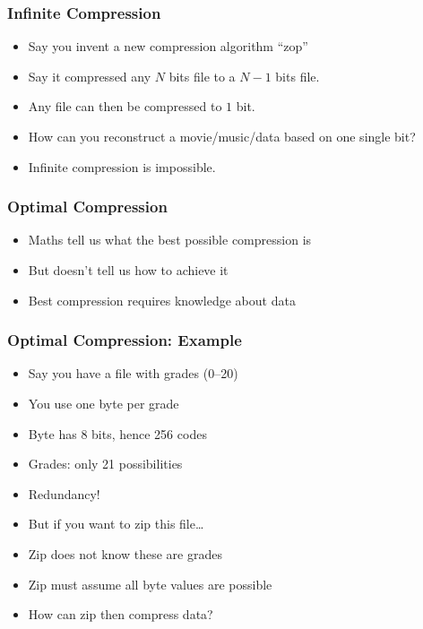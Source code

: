 \begin{frame}
  \frametitle{Infinite Compression}
  \begin{itemize}
    \item Say you invent a new compression algorithm ``zop''
    \item Say it compressed any $N$ bits file to a $N-1$ bits file.
    \item Any file can then be compressed to $1$ bit.
    \item How can you reconstruct a movie/music/data based on one single bit?
  \end{itemize}
  \begin{center}
  \end{center}
  \begin{itemize}
    \item Infinite compression is impossible.
  \end{itemize}
\end{frame}

\begin{frame}
  \frametitle{Optimal Compression}
  \begin{itemize}
    \item Maths tell us what the best possible compression is
    \item But doesn't tell us how to achieve it
    \item Best compression requires knowledge about data
  \end{itemize}
\end{frame}

\begin{frame}
  \frametitle{Optimal Compression: Example}
  \begin{itemize}
    \item Say you have a file with grades (0--20)
    \item You use one byte per grade
    \item Byte has 8 bits, hence 256 codes
    \item Grades: only 21 possibilities
    \item Redundancy!
    \item But if you want to zip this file\dots
    \item Zip does not know these are grades
    \item Zip must assume all byte values are possible
    \item How can zip then compress data?
  \end{itemize}
\end{frame}

